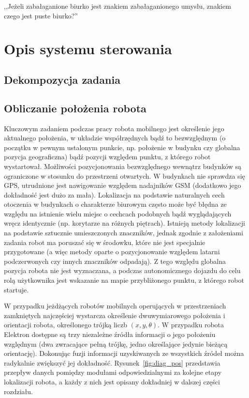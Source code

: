 

\begin{savequote}[70mm]
,,Jeżeli zabałaganione biurko jest znakiem zabałaganionego umysłu, znakiem czego
jest puste biurko?''
\end{savequote}


\chapter{Opis systemu sterowania}
\label{chap:software}

\section{Dekompozycja zadania}

\section{Obliczanie położenia robota}

Kluczowym zadaniem podczas pracy robota mobilnego jest określenie jego
aktualnego położenia, w układzie współrzędnych bądź to bezwzględnym (o początku
w pewnym ustalonym punkcie, np. położenie w budynku czy globalna pozycja
geograficzna) bądź pozycji względem punktu, z którego robot wystartował.
Możliwości pozycjonowania bezwzględnego wewnątrz budynków są ograniczone w
stosunku do przestrzeni otwartych. W budynkach nie sprawdza się GPS, utrudnione
jest nawigowanie względem nadajników GSM (dodatkowo jego dokładność jest dużo
za mała). Lokalizacja na podstawie naturalnych cech otoczenia w budynkach o
charakterze biurowym często może być błędna ze względu na istnienie wielu miejsc
o cechcach podobnych bądź wyglądających wręcz identycznie (np. korytarze na
różnych piętrach). Istnieją metody lokalizacji na podstawie sztucznie
umieszczonych znaczników, jednak zgodnie z założeniami zadania robot ma poruszać
się w środowku, które nie jest specjalnie przygotowane (a więc metody oparte o
pozycjonowanie względem latarni podczerwonych czy innych znaczników odpadają).
Z tego względu globalna pozycja robota nie jest wyznaczana, a podczas
autonomicznego dojazdu do celu rolą użytkownika jest wskazanie na mapie
przybliżonego punktu, z którego robot startuje.

W przypadku jeżdżących robotów mobilnych operujących w przestrzeniach
zamkniętych najczęściej wystarcza określenie dwuwymiarowego położenia i
orientacji robota, określonego trójką liczb $(x, y, \theta)$. W przypadku
robota Elektron dostępne są trzy niezależne źródła informacji o jego położeniu
względnym (dwa zwracające pełną trójkę, jedno określające jedynie bieżącą
orientację). Dokonując fuzji informacji uzyskiwanych ze wszystkich źródeł można
radykalnie zwiększyć jej dokładność. Rysunek~\ref{fig:diag_pos} przedstawia
przepływ danych pomiędzy modułami odpowiedzialnymi za kolejne etapy lokalizacji
robota, a każdy z nich jest opisany dokładniej w dalszej części rozdziału.

